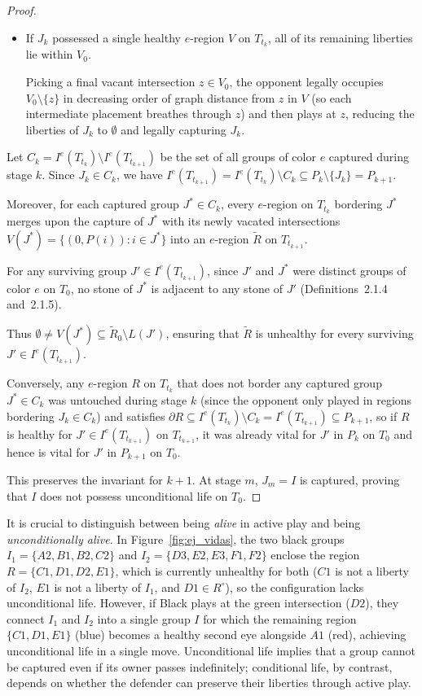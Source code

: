 \begin{proof}
\begin{itemize}
		\item If $J_k$ possessed a single healthy $e$-region $V$ on $T_{t_k}$, all of its remaining liberties lie within $V_0$.
		
		Picking a final vacant intersection $z \in V_0$, the opponent legally occupies $V_0 \setminus \{z\}$ in decreasing order of graph distance from $z$ in $V$ (so each intermediate placement breathes through $z$) and then plays at $z$, reducing the liberties of $J_k$ to $\emptyset$ and legally capturing $J_k$.
	\end{itemize}
	Let $C_k = I^e(T_{t_k}) \setminus I^e(T_{t_{k+1}})$ be the set of all groups of color $e$ captured during stage $k$. Since $J_k \in C_k$, we have $I^e(T_{t_{k+1}}) = I^e(T_{t_k}) \setminus C_k \subseteq P_k \setminus \{J_k\} = P_{k+1}$. 
	
	Moreover, for each captured group $J^* \in C_k$, every $e$-region on $T_{t_k}$ bordering $J^*$ merges upon the capture of $J^*$ with its newly vacated intersections $V(J^*) = \{(0, P(i)) : i \in J^*\}$ into an $e$-region $\tilde{R}$ on $T_{t_{k+1}}$. 
	
	For any surviving group $J' \in I^e(T_{t_{k+1}})$, since $J'$ and $J^*$ were distinct groups of color $e$ on $T_0$, no stone of $J^*$ is adjacent to any stone of $J'$ (Definitions~2.1.4 and~2.1.5). 
	
	Thus $\emptyset \neq V(J^*) \subseteq \tilde{R}_0 \setminus L(J')$, ensuring that $\tilde{R}$ is unhealthy for every surviving $J' \in I^e(T_{t_{k+1}})$. 
	
	Conversely, any $e$-region $R$ on $T_{t_k}$ that does not border any captured group $J^* \in C_k$ was untouched during stage $k$ (since the opponent only played in regions bordering $J_k \in C_k$) and satisfies $\partial R \subseteq I^e(T_{t_k}) \setminus C_k = I^e(T_{t_{k+1}}) \subseteq P_{k+1}$, so if $R$ is healthy for $J' \in I^e(T_{t_{k+1}})$ on $T_{t_{k+1}}$, it was already vital for $J'$ in $P_k$ on $T_0$ and hence is vital for $J'$ in $P_{k+1}$ on $T_0$.
	
	This preserves the invariant for $k+1$. At stage $m$, $J_m = I$ is captured, proving that $I$ does not possess unconditional life on $T_0$.
\end{proof}

It is crucial to distinguish between being \textit{alive} in active play and being \textit{unconditionally alive}. In Figure~\ref{fig:ej_vidas}, the two black groups $I_1 = \{A2, B1, B2, C2\}$ and $I_2 = \{D3, E2, E3, F1, F2\}$ enclose the region $R = \{C1, D1, D2, E1\}$, which is currently unhealthy for both ($C1$ is not a liberty of $I_2$, $E1$ is not a liberty of $I_1$, and $D1 \in R^\circ$), so the configuration lacks unconditional life. However, if Black plays at the \textcolor{Moss}{green intersection} ($D2$), they connect $I_1$ and $I_2$ into a single group $I$ for which the remaining region $\{C1, D1, E1\}$ (\textcolor{bg}{blue}) becomes a healthy second eye alongside $A1$ (\textcolor{sealred}{red}), achieving unconditional life in a single move. Unconditional life implies that a group cannot be captured even if its owner passes indefinitely; conditional life, by contrast, depends on whether the defender can preserve their liberties through active play.

